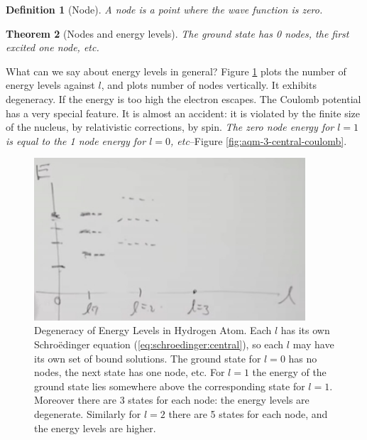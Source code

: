\documentclass[]{article}
\newtheorem{thm}{Theorem}
\newtheorem{defn}[thm]{Definition}
\begin{document}
\begin{defn}[Node]\label{defn:node}
	A node is a point where the wave function is zero.
\end{defn}

\begin{thm}[Nodes and energy levels]
	The ground state has 0 nodes, the first excited one node, etc.
\end{thm}

What can we say about energy levels in general? Figure \ref{fig:degeneracy:hydrogen} plots the number of energy levels against $l$, and plots number of nodes vertically. It exhibits degeneracy. If the energy is too high the electron escapes. The Coulomb potential has a very special feature. It is almost an accident: it is violated by the finite size of the nucleus, by relativistic corrections, by spin. \emph{The zero node energy for $l=1$ is equal to the 1 node energy for $l=0$, etc}--Figure \ref{fig:aqm-3-central-coulomb}.



\begin{figure}[H]
	\begin{center}
		\caption[Degeneracy of Energy Levels in Hydrogen Atom]{Degeneracy of Energy Levels in Hydrogen Atom. Each $l$ has its own Schro\"edinger equation (\ref{eq:schroedinger:central}), so each $l$ may have its own set of bound solutions. The ground state for $l=0$ has no nodes,  the next state has one node, etc. For $l=1$ the energy of the ground state lies somewhere above the corresponding state for $l=1$. Moreover there are 3 states for each node: the energy levels are degenerate. Similarly for $l=2$ there are 5 states for each node, and the energy levels are higher.}\label{fig:degeneracy:hydrogen}
		\includegraphics[width=0.9\textwidth]{aqm-3-hydrogen-degeneracy}
	\end{center}
\end{figure}
\end{document}
